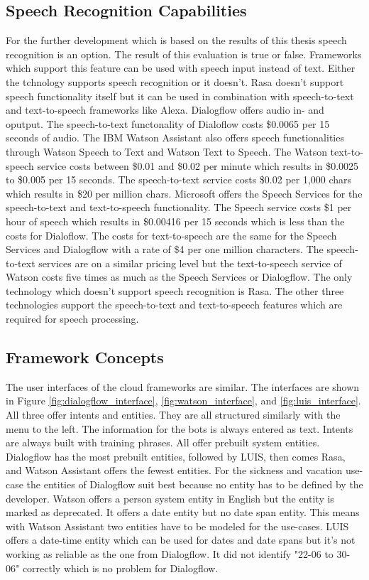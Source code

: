 \subsection*{Speech Recognition Capabilities}
For the further development which is based on the results of this thesis speech recognition 
is an option. 
The result of this evaluation is true or false.
Frameworks which support this feature can be used with speech input instead of text.
Either the tchnology supports speech recognition or it doesn't. 
Rasa doesn't support speech functionality itself but it can be used in combination with 
speech-to-text and text-to-speech frameworks like Alexa.
Dialogflow offers audio in- and oputput.
The speech-to-text functonality of Dialoflow costs \$0.0065 per 15 seconds of audio.
The IBM Watson Assistant also offers speech functionalities through Watson Speech to 
Text and Watson Text to Speech.
The Watson text-to-speech service costs between \$0.01 and \$0.02 per minute which results 
in \$0.0025 to \$0.005 per 15 seconds.
The speech-to-text service costs \$0.02 per 1,000 chars which results in 
\$20 per million chars.
Microsoft offers the Speech Services for the speech-to-text and text-to-speech functionality.
The Speech service costs \$1 per hour of speech which results in \$0.00416 per 15 seconds which is 
less than the costs for Dialoflow.
The costs for text-to-speech are the same for the Speech Services and Dialogflow with a 
rate of \$4 per one million characters.
The speech-to-text services are on a similar pricing level but the text-to-speech service of 
Watson costs five times as much as the Speech Services or Dialogflow.
The only technology which doesn't support speech recognition is Rasa.
The other three technologies support the speech-to-text and text-to-speech features 
which are required for speech processing.   


\subsection*{Framework Concepts}
The user interfaces of the cloud frameworks are similar.
The interfaces are shown in Figure \ref{fig:dialogflow_interface},
\ref{fig:watson_interface}, and \ref{fig:luis_interface}.
All three offer intents and entities.
They are all structured similarly with the menu to the left.
The information for the bots is always entered as text.
Intents are always built with training phrases.
All offer prebuilt system entities.
Dialogflow has the most prebuilt entities, followed by LUIS,
then comes Rasa, and Watson Assistant offers the fewest entities.
For the sickness and vacation use-case the entities of 
Dialogflow suit best because no entity has to be defined by 
the developer. 
Watson offers a person system entity in English but the entity
is marked as deprecated.
It offers a date entity but no date span entity.
This means with Watson Assistant two entities have to be 
modeled for the use-cases.
LUIS offers a date-time entity which can be used for dates and 
date spans but it's not working as reliable as the one from 
Dialogflow.
It did not identify "22-06 to 30-06" correctly
which is no problem for Dialogflow.



